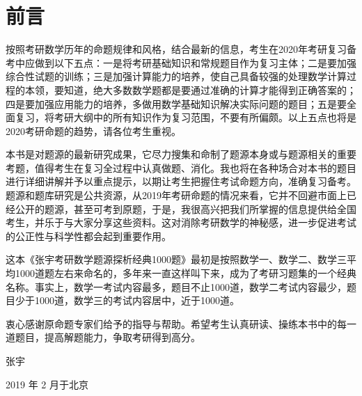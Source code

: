 \chapter{前言}
	按照考研数学历年的命题规律和风格，结合最新的信息，考生在2020年考研复习备考中应做到以下五点：一是将考研基础知识和常规题目作为复习主体；二是要加强综合性试题的训练；三是加强计算能力的培养，使自己具备较强的处理数学计算过程的本领，要知道，绝大多数数学题都是要通过准确的计算才能得到正确答案的；四是要加强应用能力的培养，多做用数学基础知识解决实际问题的题目；五是要全面复习，将考研大纲中的所有知识作为复习范围，不要有所偏颇。以上五点也将是2020考研命题的趋势，请各位考生重视。

	本书是对题源的最新研究成果，它尽力搜集和命制了题源本身或与题源相关的重要考题，值得考生在复习全过程中认真做题、消化。我也将在各种场合对本书的题目进行详细讲解并予以重点提示，以期让考生把握住考试命题方向，准确复习备考。题源和题库研究是公共资源，从2019年考研命题的情况来看，它并不回避市面上已经公开的题源，甚至可考到原题，于是，我很高兴把我们所掌握的信息提供给全国考生，并乐于与大家分享这些资料。这对消除考研数学的神秘感，进一步促进考试的公正性与科学性都会起到重要作用。

	这本《张宇考研数学题源探析经典1000题》最初是按照数学一、数学二、数学三平均1000道题左右来命名的，多年来一直这样叫下来，成为了考研习题集的一个经典名称。事实上，数学一考试内容最多，题目不止1000道，数学二考试内容最少，题目少于1000道，数学三的考试内容居中，近于1000道。

	衷心感谢原命题专家们给予的指导与帮助。希望考生认真研读、操练本书中的每一道题目，提高解题能力，争取考研得到高分。

	\phantom{1}\hspace{\fill} {\LARGE 张宇}
	
	\phantom{1}\hspace{\fill} {2019 年 2 月\quad 于北京}